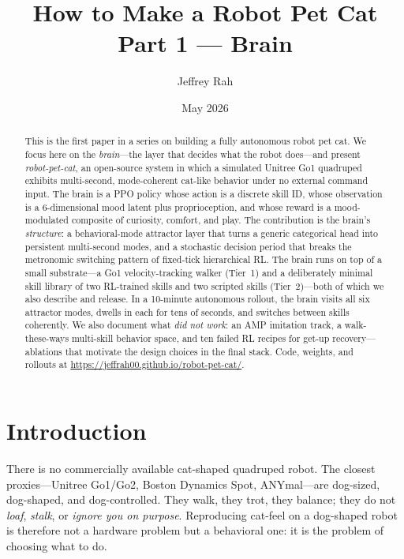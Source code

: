 \documentclass[11pt]{article}
\title{How to Make a Robot Pet Cat\\
\large Part 1 --- Brain}
\author{Jeffrey Rah}
\affil{Independent\\\texttt{jeffrah89@gmail.com}}
\date{May 2026}
\begin{document}
\maketitle

\begin{abstract}
This is the first paper in a series on building a fully autonomous robot pet
cat. We focus here on the \emph{brain}---the layer that decides what the
robot does---and present \emph{robot-pet-cat}, an open-source system in which
a simulated Unitree Go1 quadruped exhibits multi-second, mode-coherent
cat-like behavior under no external command input. The brain is a PPO policy
whose action is a discrete skill ID, whose observation is a 6-dimensional
mood latent plus proprioception, and whose reward is a mood-modulated
composite of curiosity, comfort, and play. The contribution is the brain's
\emph{structure}: a behavioral-mode attractor layer that turns a generic
categorical head into persistent multi-second modes, and a stochastic
decision period that breaks the metronomic switching pattern of fixed-tick
hierarchical RL. The brain runs on top of a small substrate---a Go1
velocity-tracking walker (Tier~1) and a deliberately minimal skill library
of two RL-trained skills and two scripted skills (Tier~2)---both of which we
also describe and release. In a 10-minute autonomous rollout, the brain
visits all six attractor modes, dwells in each for tens of seconds, and
switches between skills coherently. We also document what \emph{did not
work}: an AMP imitation track, a walk-these-ways multi-skill behavior space,
and ten failed RL recipes for get-up recovery---ablations that motivate the
design choices in the final stack. Code, weights, and rollouts at
\url{https://jeffrah00.github.io/robot-pet-cat/}.
\end{abstract}

\section{Introduction}

There is no commercially available cat-shaped quadruped robot. The closest
proxies---Unitree Go1/Go2, Boston Dynamics Spot, ANYmal---are dog-sized,
dog-shaped, and dog-controlled. They walk, they trot, they balance; they do
not \emph{loaf}, \emph{stalk}, or \emph{ignore you on purpose}. Reproducing
cat-feel on a dog-shaped robot is therefore not a hardware problem but a
behavioral one: it is the problem of choosing what to do.
\end{document}
